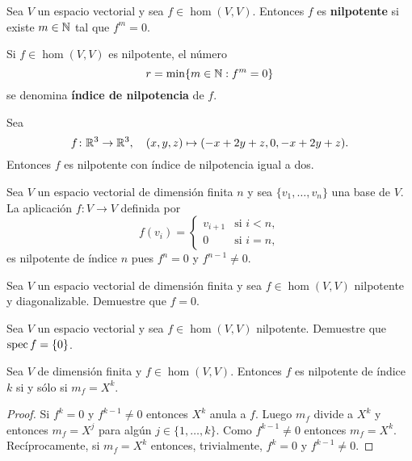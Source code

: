 \begin{block}
    Sea $V$ un espacio vectorial y sea $f\in\hom(V,V)$. Entonces $f$ es
    \textbf{nilpotente} si existe $m\in\mathbb{N}$ tal que $f^m=0$.

	Si $f\in\hom(V,V)$ es nilpotente, el
    número
    \[
        r=\min\{m\in\mathbb{N}:f^m=0\}
    \]
    se denomina \textbf{índice de nilpotencia} de $f$.
\end{block}

\begin{example}
	Sea \[
		f\colon\mathbb{R}^3\to\mathbb{R}^3,\quad
		(x,y,z)\mapsto (-x+2y+z,0,-x+2y+z).
	\]
    Entonces $f$ es nilpotente con índice de nilpotencia igual a dos.
\end{example}

\begin{example}
    Sea $V$ un espacio vectorial de dimensión finita $n$ y sea
    $\{v_1,\dots,v_n\}$ una base de $V$. La aplicación
    $f\colon V\to V$ definida por
    \[
    f(v_i)=\begin{cases}
        v_{i+1} & \text{si $i<n$},\\
        0 & \text{si $i=n$},
    \end{cases}
    \]
    es nilpotente de índice $n$ pues $f^n=0$ y $f^{n-1}\ne0$. 
\end{example}


\begin{xca}
    \label{xca:nilpotente_y_diagonalizable=0}
    Sea $V$ un espacio vectorial de dimensión finita y sea $f\in\hom(V,V)$
    nilpotente y diagonalizable. Demuestre que $f=0$.
\end{xca}

\begin{xca}
    \label{xca:nilpotente:autovalores}
    Sea $V$ un espacio vectorial y sea $f\in\hom(V,V)$ nilpotente. Demuestre
    que $\operatorname{spec} f=\{0\}$. 
\end{xca}

\begin{prop}
    Sea $V$ de dimensión finita y $f\in\hom(V,V)$. Entonces $f$ es nilpotente
    de índice $k$ si y sólo si $m_f=X^k$. 

	\begin{proof}
        Si $f^k=0$ y $f^{k-1}\ne0$ entonces $X^k$ anula a $f$. Luego $m_f$
        divide a $X^k$ y entonces $m_f=X^j$ para algún $j\in\{1,\dots,k\}$.
        Como $f^{k-1}\ne0$ entonces $m_f=X^k$.  Recíprocamente, si $m_f=X^k$
        entonces, trivialmente, $f^k=0$ y $f^{k-1}\ne0$. 
	\end{proof}
\end{prop}

